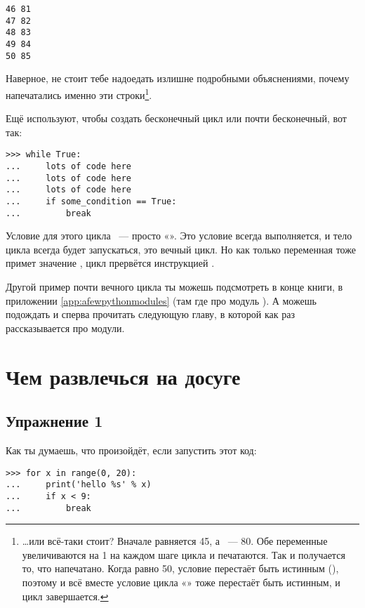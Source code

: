 \begin{listing}
\begin{verbatim}
46 81
47 82
48 83
49 84
50 85
\end{verbatim}
\end{listing}

Наверное, не стоит тебе надоедать излишне подробными объяснениями, почему напечатались именно эти строки\footnote{…или всё-таки стоит? Вначале  равняется 45, а  — 80. Обе переменные увеличиваются на 1 на каждом шаге цикла и печатаются. Так и получается то, что напечатано. Когда  равно 50, условие  перестаёт быть истинным (), поэтому и всё вместе условие цикла «» тоже перестаёт быть истинным, и цикл завершается.}.

Ещё  используют, чтобы создать бесконечный цикл или почти бесконечный, вот так:

\begin{verbatim}
>>> while True:
...     lots of code here
...     lots of code here
...     lots of code here
...     if some_condition == True:
...         break
\end{verbatim}

Условие для этого цикла  — просто «». Это условие всегда выполняется, и тело цикла всегда будет запускаться, это вечный цикл. Но как только переменная  тоже примет значение , цикл прервётся инструкцией .

Другой пример почти вечного цикла ты можешь подсмотреть в конце книги, в приложении \ref{app:afewpythonmodules} (там где про модуль ). А можешь подождать и сперва прочитать следующую главу, в которой как раз рассказывается про модули.

\section{Чем развлечься на досуге}


\subsection*{Упражнение 1}
Как ты думаешь, что произойдёт, если запустить этот код:

\begin{listing}
\begin{verbatim}
>>> for x in range(0, 20):
...     print('hello %s' % x)
...     if x < 9:
...         break
\end{verbatim}
\end{listing}

